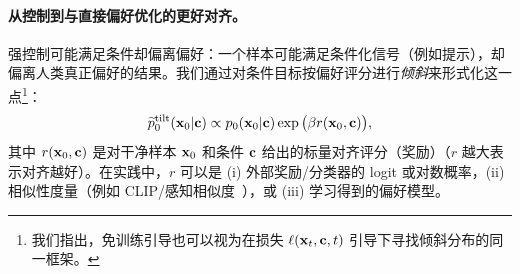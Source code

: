 \paragraph{从控制到与直接偏好优化的更好对齐。}
强控制可能满足条件却偏离偏好：一个样本可能满足条件化信号（例如提示），却偏离人类真正偏好的结果。我们通过对条件目标按偏好评分进行\emph{倾斜}来形式化这一点\footnote{我们指出，免训练引导也可以视为在损失 $\ell({\mathbf{x}}_t, {\mathbf{c}}, t)$ 引导下寻找倾斜分布的同一框架。}：
\[
\widetilde p_0^{\mathrm{tilt}}({\mathbf{x}}_0| {\mathbf{c}}) \propto p_0({\mathbf{x}}_0|{\mathbf{c}}) \exp \big(\beta r({\mathbf{x}}_0,{\mathbf{c}})\big),
\]
其中 $r({\mathbf{x}}_0,{\mathbf{c}})$ 是对干净样本 ${\mathbf{x}}_0$ 和条件 ${\mathbf{c}}$ 给出的标量对齐评分（奖励）（$r$ 越大表示对齐越好）。在实践中，$r$ 可以是 (i) 外部奖励/分类器的 logit 或对数概率，(ii) 相似性度量（例如 CLIP/感知相似度~\citep{radford2021learning}），或 (iii) 学习得到的偏好模型。



